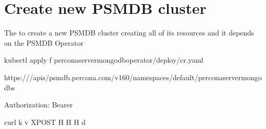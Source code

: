 \documentclass[letterpaper,10pt,english]{sphinxmanual}
\begin{document}
\section{Create new PSMDB cluster}
\label{\detokenize{api:create-new-psmdb-cluster}}

\begin{sphinxVerbatim}[commandchars=\\\{\}]
The  to create a new PSMDB cluster creating all of its resources and it depends on the PSMDB Operator
\end{sphinxVerbatim}


\begin{sphinxVerbatim}[commandchars=\\\{\}]
kubectl apply \PYGZhy{}f percona\PYGZhy{}server\PYGZhy{}mongodb\PYGZhy{}operator/deploy/cr.yaml
\end{sphinxVerbatim}


\begin{sphinxVerbatim}[commandchars=\\\{\}]
https:///apis/psmdb.percona.com/v1\PYGZhy{}6\PYGZhy{}0/namespaces/default/perconaservermongodbs
\end{sphinxVerbatim}


\begin{sphinxVerbatim}[commandchars=\\\{\}]
Authorization: Bearer 
\end{sphinxVerbatim}


\begin{sphinxVerbatim}[commandchars=\\\{\}]
curl \PYGZhy{}k \PYGZhy{}v \PYGZhy{}XPOST  
            \PYGZhy{}H  
            \PYGZhy{}H  
            \PYGZhy{}H  
            \PYGZhy{}d 
\end{sphinxVerbatim}
\end{document}
